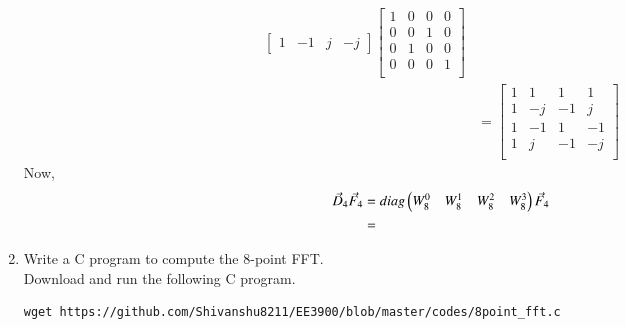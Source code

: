 \documentclass[journal,12pt,twocolumn]{IEEEtran}
\renewcommand\thesection{\arabic{section}}
\begin{document}
\begin{enumerate}[label=\arabic*.,ref=\thesection.\theenumi]
\begin{align}
\begin{bmatrix}
                                  1 & -1 & j  & -j
                             \end{bmatrix}\begin{bmatrix}
                                               1 & 0 & 0 & 0 \\
                                               0 & 0 & 1 & 0 \\
                                               0 & 1 & 0 & 0 \\
                                               0 & 0 & 0 & 1 \\
                                          \end{bmatrix}           \\
                          & =\begin{bmatrix}
                                  1 & 1  & 1  & 1  \\
                                  1 & -j & -1 & j  \\
                                  1 & -1 & 1  & -1 \\
                                  1 & j  & -1 & -j \\
                             \end{bmatrix}
           \end{align}
           Now,
           \begin{align}
                \vec{D}_{4}\vec{F}_{4} & =diag\begin{pmatrix}W_{8}^{0} & W_{8}^{1} & W_{8}^{2} & W_{8}^{3}\end{pmatrix}\vec{F}_{4} \\
                                       & =
           \end{align}
     \item Write a C program to compute the 8-point FFT. \\
           \solution Download and run the following C program.
           \begin{lstlisting}
wget https://github.com/Shivanshu8211/EE3900/blob/master/codes/8point_fft.c
           \end{lstlisting}
\end{enumerate}
\end{document}
